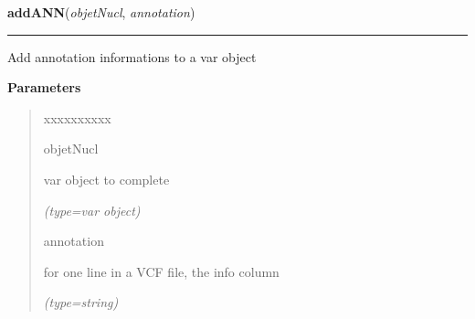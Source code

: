 \hspace{.8\funcindent}\begin{boxedminipage}{\funcwidth}

    \raggedright \textbf{addANN}(\textit{objetNucl}, \textit{annotation})

    \vspace{-1.5ex}

    \rule{\textwidth}{0.5\fboxrule}
\setlength{\parskip}{2ex}
    Add annotation informations to a var object

\setlength{\parskip}{1ex}
      \textbf{Parameters}
      \vspace{-1ex}

      \begin{quote}
        \begin{Ventry}{xxxxxxxxxx}

          \item[objetNucl]

          var object to complete

            {\it (type=var object)}

          \item[annotation]

          for one line in a VCF file, the info column

            {\it (type=string)}

        \end{Ventry}

      \end{quote}

    \end{boxedminipage}

    \label{script-phyloFixedVar:readVCFfile}

    \vspace{0.5ex}

